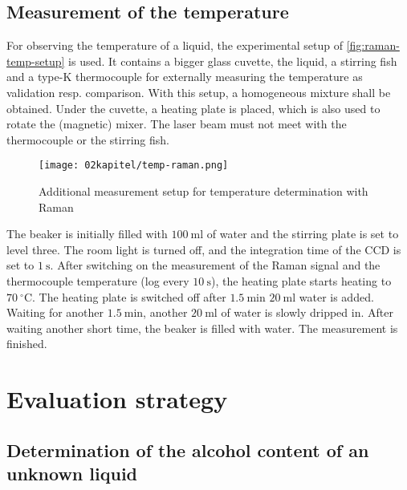 \subsection{Measurement of the temperature}

For observing the temperature of a liquid, the experimental setup of \autoref{fig:raman-temp-setup} is used. It contains a bigger glass cuvette, the liquid, a stirring fish and a type-K thermocouple for externally measuring the temperature as validation resp. comparison. With this setup, a homogeneous mixture shall be obtained. Under the cuvette, a heating plate is placed, which is also used to rotate the (magnetic) mixer. The laser beam must not meet with the thermocouple or the stirring fish.

\begin{figure}[!htb]
    \centering
    \texttt{[image: 02kapitel/temp-raman.png]}
    \caption[Additional measurement setup for temperature determination with Raman]{Additional measurement setup for temperature determination with Raman \autocite{brauerApplicationRamanSpectroscopy2022}}
    \label{fig:raman-temp-setup}
\end{figure}

The beaker is initially filled with $100~\mathrm{ml}$ of water and the stirring plate is set to level three. The room light is turned off, and the integration time of the CCD is set to $1~\mathrm{s}$. After switching on the measurement of the Raman signal and the thermocouple temperature (log every $10~\mathrm{s}$), the heating plate starts heating to $70~\mathrm{^\circ C}$. The heating plate is switched off after $1.5~\mathrm{min}$ $20~\mathrm{ml}$ water is added. Waiting for another $1.5~\mathrm{min}$, another $20~\mathrm{ml}$ of water is slowly dripped in. After waiting another short time, the beaker is filled with water. The measurement is finished.

\section{Evaluation strategy}

\subsection{Determination of the alcohol content of an unknown liquid}

